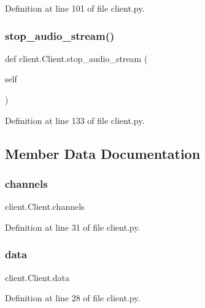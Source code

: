 Definition at line 101 of file client.\+py.

\mbox{\label{classclient_1_1_client_a1ad22cceab7abf799d72603c012e4bcd}} 
\subsubsection{\texorpdfstring{stop\_audio\_stream()}{stop\_audio\_stream()}}
{\footnotesize\ttfamily def client.\+Client.\+stop\+\_\+audio\+\_\+stream (\begin{DoxyParamCaption}\item[{}]{self }\end{DoxyParamCaption})}



Definition at line 133 of file client.\+py.



\subsection{Member Data Documentation}
\mbox{\label{classclient_1_1_client_a4a1d5324e5bcc2a81ad4e99855b54e8b}} 
\subsubsection{\texorpdfstring{channels}{channels}}
{\footnotesize\ttfamily client.\+Client.\+channels}



Definition at line 31 of file client.\+py.

\mbox{\label{classclient_1_1_client_a4cd9cd6ca5116719e5740d8c613aa6fd}} 
\subsubsection{\texorpdfstring{data}{data}}
{\footnotesize\ttfamily client.\+Client.\+data}



Definition at line 28 of file client.\+py.

